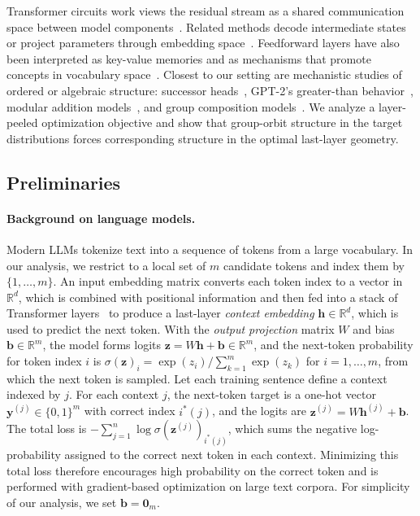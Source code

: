 \documentclass[11pt]{article}
\begin{document}
Transformer circuits work views the residual stream as a shared communication space between model components~\citep{elhage2021mathematical}. Related methods decode intermediate states or project parameters through embedding space~\citep{belrose2023eliciting,dar2023analyzing}. Feedforward layers have also been interpreted as key-value memories and as mechanisms that promote concepts in vocabulary space~\citep{geva2021transformer,geva2022transformer}. Closest to our setting are mechanistic studies of ordered or algebraic structure: successor heads~\citep{gould2024successor}, GPT-2's greater-than behavior~\citep{hanna2023does}, modular addition models~\citep{nanda2023progress}, and group composition models~\citep{chughtai2023toy}. We analyze a layer-peeled optimization objective and show that group-orbit structure in the target distributions forces corresponding structure in the optimal last-layer geometry.

\subsection{Preliminaries}

\paragraph{Background on language models.}
Modern LLMs tokenize text into a sequence of tokens from a large vocabulary. In our analysis, we restrict to a local set of \(m\) candidate tokens and index them by \(\{1,\dots,m\}\).
An input embedding matrix converts each token index to a vector in \(\mathbb{R}^{d}\), which is combined with positional information and then fed into a stack of Transformer layers~\citep{vaswani2017attention} to produce a last-layer \emph{context embedding} \(\boldsymbol{h}\in\mathbb{R}^{d}\), which is used to predict the next token.
With the \emph{output projection} matrix \(W\) and bias \(\boldsymbol b\in\mathbb{R}^{m}\), the model forms logits \(\boldsymbol z=W\boldsymbol h+\boldsymbol b\in\mathbb{R}^{m}\), and the next-token probability for token index \(i\) is \(\sigma(\boldsymbol z)_i=\exp(z_i)\big/\sum_{k=1}^{m}\exp(z_k)\) for \(i=1,\dots,m\), from which the next token is sampled. Let each training sentence define a context indexed by \(j\).
For each context \(j\), the next-token target is a one-hot vector \(\boldsymbol{y}^{(j)}\in\{0,1\}^{m}\) with correct index \(i^*(j)\), and the logits are \(\boldsymbol{z}^{(j)}=W \boldsymbol{h}^{(j)}+\boldsymbol{b}\). The total loss is \(-\sum_{j=1}^{n}\log \sigma(\boldsymbol z^{(j)})_{i^*(j)}\), which sums the negative log-probability assigned to the correct next token in each context. Minimizing this total loss therefore encourages high probability on the correct token and is performed with gradient-based optimization on large text corpora. For simplicity of our analysis, we set \(\boldsymbol{b}=\boldsymbol{0}_{m}\).
\end{document}
